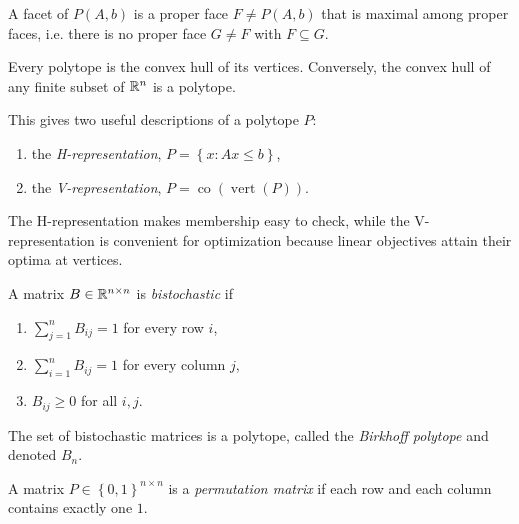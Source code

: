 \begin{definition}[Facet]
	A facet of $P(A,b)$ is a proper face $F \ne P(A,b)$ that is maximal among proper faces, i.e. there is no proper face $G \ne F$ with $F \subseteq G$.
\end{definition}

\begin{proposition}
	Every polytope is the convex hull of its vertices. Conversely, the convex hull of any finite subset of $\mathbb{R}^n$ is a polytope.
\end{proposition}

This gives two useful descriptions of a polytope $P$:
\begin{enumerate}[label = (\roman*)]
	\item the \emph{H-representation}, $P = \left\{x : Ax \le b\right\}$,
	\item the \emph{V-representation}, $P = \operatorname{co}\left(\operatorname{vert}(P)\right)$.
\end{enumerate}
The H-representation makes membership easy to check, while the V-representation is convenient for optimization because linear objectives attain their optima at vertices.

\begin{example}
	A matrix $B \in \mathbb{R}^{n\times n}$ is \emph{bistochastic} if
	\begin{enumerate}[label = (\roman*)]
		\item $\sum_{j=1}^n B_{ij} = 1$ for every row $i$,
		\item $\sum_{i=1}^n B_{ij} = 1$ for every column $j$,
		\item $B_{ij} \ge 0$ for all $i,j$.
	\end{enumerate}
	The set of bistochastic matrices is a polytope, called the \emph{Birkhoff polytope} and denoted $B_n$.

	A matrix $P \in \left\{0,1\right\}^{n\times n}$ is a \emph{permutation matrix} if each row and each column contains exactly one $1$.
\end{example}

